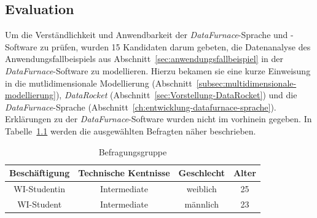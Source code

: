 \documentclass[
  language=german, %
  type=bachelor,%
  ngerman
]{isthesis}
\begin{document}
\begin{content}

%  


\chapter{Evaluation}\label{ch:evaluation}

Um die Verständlichkeit und Anwendbarkeit der \textit{DataFurnace}-Sprache und
-Software zu prüfen, wurden 15 Kandidaten darum gebeten, die Datenanalyse des
Anwendungsfallbeispiels aus Abschnitt~\ref{sec:anwendungsfallbeispiel} in der
\textit{DataFurnace}-Software zu modellieren. Hierzu bekamen sie eine kurze
Einweisung in die mutlidimensionale Modellierung
(Abschnitt~\ref{subsec:multidimensionale-modellierung}), \textit{DataRocket}
(Abschnitt~\ref{sec:Vorstellung-DataRocket}) und die
\textit{DataFurnace}-Sprache
(Abschnitt~\ref{ch:entwicklung-datafurnace-sprache}). Erklärungen zu der
\textit{DataFurnace}-Software wurden nicht im vorhinein gegeben.  In
Tabelle~\ref{table:befragungsgruppe} werden die ausgewählten Befragten näher
beschrieben.

  \begin{table}[]
    \footnotesize
    \begin{tabular}{c c c c}
      Beschäftigung & Technische Kentnisse & Geschlecht & Alter \\
      \toprule
      WI-Studentin & Intermediate & weiblich & 25 \\
      WI-Student & Intermediate & männlich & 23 \\
    \end{tabular}
    \caption{Befragungsgruppe}\label{table:befragungsgruppe}
  \end{table}


\end{content}
\end{document}

